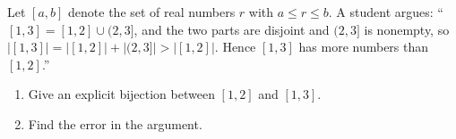 Let $[a,b]$ denote the set of real numbers $r$ with $a\le r\le b$. A student argues: ``$[1,3]=[1,2]\cup(2,3]$, and the two parts are disjoint and $(2,3]$ is nonempty, so $|[1,3]|=|[1,2]|+|(2,3]|>|[1,2]|$. Hence $[1,3]$ has more numbers than $[1,2]$.''
\begin{enumerate}
\item[(a)] Give an explicit bijection between $[1,2]$ and $[1,3]$.
\item[(b)] Find the error in the argument.
\end{enumerate}
